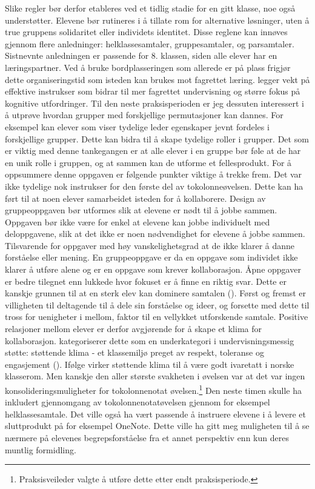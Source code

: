 \documentclass[main.tex]{subfiles}
\begin{document}
Slike regler bør derfor etableres ved et tidlig stadie for en gitt klasse, noe 
også understøtter. Elevene bør rutineres i å tillate rom for alternative løsninger, uten å true 
gruppens solidaritet eller individets identitet. Disse reglene kan innøves gjennom flere 
anledninger: helklassesamtaler, gruppesamtaler, og parsamtaler. Sistnevnte anledningen er passende
for 8. klassen, siden alle elever har en læringspartner. Ved å bruke bordplasseringen som allerede 
er på plass frigjør dette organiseringstid som isteden kan brukes mot fagrettet læring. 
 legger vekt på effektive instrukser som bidrar til mer fagrettet undervisning og 
større fokus på kognitive utfordringer.
\newline
\newline
Til den neste praksisperioden er jeg dessuten interessert i å utprøve hvordan grupper med forskjellige 
permutasjoner kan dannes.  For eksempel kan elever som viser tydelige leder egenskaper jevnt fordeles i 
forskjellige grupper. Dette kan bidra til å skape tydelige roller i grupper. Det som er viktig med denne 
tankegangen er at alle elever i en gruppe bør føle at de har en unik rolle i gruppen, og at sammen kan 
de utforme et fellesprodukt.
\newline
\newline
For å oppsummere denne oppgaven er følgende punkter viktige å trekke frem. Det var ikke tydelige 
nok instrukser for den første del av tokolonneøvelsen. Dette kan ha ført til at noen elever 
samarbeidet isteden for å kollaborere. Design av gruppeoppgaven bør utformes slik at elevene er 
nødt til å jobbe sammen. Oppgaven bør ikke være for enkel at elevene kan jobbe individuelt med 
deloppgavene, slik at det ikke er noen nødvendighet for elevene å jobbe sammen. Tilsvarende 
for oppgaver med høy vanskelighetsgrad at de ikke klarer å danne forståelse eller mening. 
En gruppeoppgave er da en oppgave som individet ikke klarer å utføre alene og er en oppgave som 
krever kollaborasjon. Åpne oppgaver er bedre tilegnet enn lukkede hvor fokuset er å finne 
en riktig svar. Dette er kanskje grunnen til at en sterk elev kan dominere samtalen 
(). Først og fremst er villigheten til deltagende til å dele sin forståelse 
og ideer, og forsette med dette til tross for uenigheter i mellom, faktor til en vellykket 
utforskende samtale. Positive relasjoner mellom elever er derfor avgjørende for å skape et klima 
for kollaborasjon.  kategoriserer dette som en underkategori i 
undervisningsmessig støtte: støttende klima - et klassemiljø preget av respekt, toleranse og 
engasjement (). Ifølge  virker støttende klima til å være 
godt ivaretatt i norske klasserom. Men kanskje den aller største svakheten i øvelsen var at det 
var ingen konsolideringsmuligheter for tokolonnenotat øvelsen.\footnote[5]{Praksisveileder valgte 
å utføre dette etter endt praksisperiode.} Den neste timen skulle ha inkludert gjennomgang av 
tokolonnenotatøvelsen gjennom for eksempel helklassesamtale. Det ville også ha vært passende
å instruere elevene i å levere et sluttprodukt på for eksempel OneNote. Dette ville ha gitt meg
muligheten til å se nærmere på elevenes begrepsforståelse fra et annet perspektiv enn kun deres 
muntlig formidling.  
\end{document}
